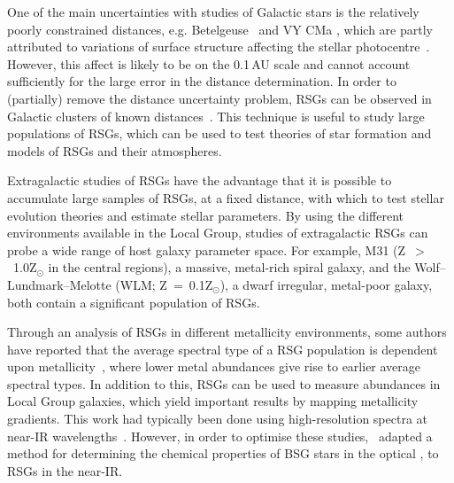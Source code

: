One of the main uncertainties with studies of Galactic stars is the relatively poorly constrained distances, e.g. Betelgeuse~\citep[197\,$\pm$\,45\,pc;][]{Harper08} and VY CMa
\citep[$\sim$1300\,$\pm$\,120\,pc;][]{Wittowski12,2012ApJ...744...23Z}, which are partly attributed to variations of surface structure affecting the stellar photocentre~\citep{2011A&A...528A.120C}.
However, this affect is likely to be on the 0.1\,AU scale and cannot account sufficiently for the large error in the distance determination.
In order to (partially) remove the distance uncertainty problem, RSGs can be observed in Galactic clusters of known distances~\citep[e.g.][]{Humphreys78, Mel'Nik95,2014ApJ...788...58G}.
This technique is useful to study large populations of RSGs, which can be used to test theories of star formation and models of RSGs and their atmospheres.


Extragalactic studies of RSGs have the advantage that it is possible to accumulate large samples of RSGs, at a fixed distance, with which to test stellar evolution theories and estimate stellar parameters.
By using the different environments available in the Local Group, studies of extragalactic RSGs can probe a wide range of host galaxy parameter space.
For example, M31 (Z~$>$~1.0Z$_{\odot}$ in the central regions), a massive, metal-rich spiral galaxy, and the Wolf--Lundmark--Melotte (WLM; Z~=~0.1Z$_{\odot}$), a dwarf irregular, metal-poor galaxy, both contain a significant population of RSGs.

Through an analysis of RSGs in different metallicity environments, some authors have reported that the average spectral type of a RSG population is dependent upon metallicity~\citep{Elias85, MasseyOlsen03, 2012AJ....144....2L}, where lower metal abundances give rise to earlier average spectral types.
In addition to this, RSGs can be used to measure abundances in Local Group galaxies, which yield important results by mapping metallicity gradients.
This work had typically been done using high-resolution spectra at near-IR wavelengths~\citep{Cunha07, Davies09a,Davies09b}.
However, in order to optimise these studies,~\cite{2010MNRAS.407.1203D} adapted a method for determining the chemical properties of BSG stars in the optical
\citep{2008ApJ...681..269K,2010AN....331..459K}, to RSGs in the near-IR.

